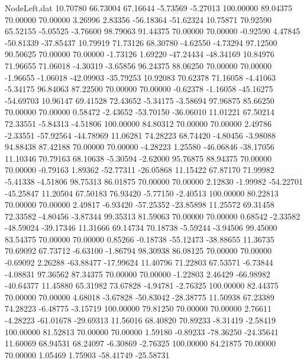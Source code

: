 \begin{filecontents}{NodeLeft.dat}
  10.70780   66.73004   67.16644    -5.73569   -5.27013  100.00000   89.04375   70.00000   70.00000    3.26996    2.83356  -56.18364  -51.62324
  10.75871   70.92590   65.52155    -5.05525   -3.76600   98.79063   91.44375   70.00000   70.00000   -0.92590    4.47845  -50.81339  -37.85437
  10.79919   71.73126   68.30780    -4.62550   -4.73294   97.12500   90.50625   70.00000   70.00000   -1.73126    1.69220  -47.24434  -48.34169
  10.84976   71.96655   71.06018    -4.30319   -3.65856   96.24375   88.06250   70.00000   70.00000   -1.96655   -1.06018  -42.09903  -35.79253
  10.92083   70.62378   71.16058    -4.41063   -5.34175   96.84063   87.22500   70.00000   70.00000   -0.62378   -1.16058  -45.16275  -54.69703
  10.96147   69.41528   72.43652    -5.34175   -3.58694   97.96875   85.66250   70.00000   70.00000    0.58472   -2.43652  -53.70150  -36.06010
  11.01221   67.50214   72.33551    -5.84313   -4.51806  100.00000   84.80312   70.00000   70.00000    2.49786   -2.33551  -57.92564  -44.78969
  11.06281   74.28223   68.74420    -4.80456   -3.98088   94.88438   87.42188   70.00000   70.00000   -4.28223    1.25580  -46.06846  -38.17056
  11.10346   70.79163   68.10638    -5.30594   -2.62000   95.76875   88.94375   70.00000   70.00000   -0.79163    1.89362  -52.77311  -26.05868
  11.15422   67.87170   71.99982    -5.41338   -4.51806   98.75313   86.01875   70.00000   70.00000    2.12830   -1.99982  -54.22701  -45.25847
  11.20504   67.50183   76.93420    -5.77150   -2.40513  100.00000   80.22813   70.00000   70.00000    2.49817   -6.93420  -57.25352  -23.85898
  11.25572   69.31458   72.33582    -4.80456   -3.87344   99.35313   81.59063   70.00000   70.00000    0.68542   -2.33582  -48.59024  -39.17346
  11.31666   69.14734   70.18738    -5.59244   -3.94506   99.45000   83.54375   70.00000   70.00000    0.85266   -0.18738  -55.12473  -38.88655
  11.36735   70.69092   67.73712    -6.63100   -1.86794   98.30938   86.08125   70.00000   70.00000   -0.69092    2.26288  -63.88477  -17.99624
  11.40796   71.22803   67.53571    -6.73844   -4.08831   97.36562   87.34375   70.00000   70.00000   -1.22803    2.46429  -66.98982  -40.64377
  11.45880   65.31982   73.67828    -4.94781   -2.76325  100.00000   82.44375   70.00000   70.00000    4.68018   -3.67828  -50.83042  -28.38775
  11.50938   67.23389   74.28223    -6.48775   -3.15719  100.00000   79.81250   70.00000   70.00000    2.76611   -4.28223  -61.01678  -29.69313
  11.56016   68.40820   70.89233    -8.31419   -2.58419  100.00000   81.52813   70.00000   70.00000    1.59180   -0.89233  -78.36250  -24.35641
  11.60069   68.94531   68.24097    -6.30869   -2.76325  100.00000   84.21875   70.00000   70.00000    1.05469    1.75903  -58.41749  -25.58731

\end{filecontents}
